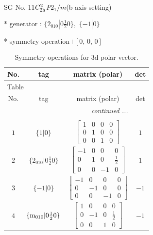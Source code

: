 \documentclass[fleqn,8pt]{jsarticle}
\begin{document}
\setcounter{MaxMatrixCols}{32}

\renewcommand{\tablename}{Table~}
\renewcommand{\figurename}{Figure~}
\begin{center}
\LARGE
SG No. 11\quad$C_{\rm 2h}^{2}$\quad$P2_1/m$\quad(b-axis setting)\quad[ monoclinic ]
\end{center}

* generator : $\{2{}_{010}|0 \frac{1}{2} 0\},\,\,\{-1|0\}$

* symmetry operation\quad$+\left[ 0,\, 0,\, 0 \right]$
\renewcommand{\arraystretch}{1.3}
\begin{longtable}{cccc}
\caption{Symmetry operations for 3d polar vector.}
 \\
 \hline \hline
No. & tag & matrix (polar) & det \\ \hline \endfirsthead

\multicolumn{3}{l}{\tablename\ \thetable{}} \\
 \hline \hline
No. & tag & matrix (polar) & det \\ \hline \endhead

 \hline \hline
\multicolumn{3}{r}{\footnotesize\it continued ...} \\ \endfoot

 \hline \hline
\multicolumn{3}{r}{} \\ \endlastfoot

$ 1 $ & $ \{1|0\} $ & $ \begin{bmatrix} 1 & 0 & 0 & 0 \\ 0 & 1 & 0 & 0 \\ 0 & 0 & 1 & 0 \end{bmatrix} $ & $ 1 $ \\ \hline
$ 2 $ & $ \{2{}_{010}|0 \frac{1}{2} 0\} $ & $ \begin{bmatrix} -1 & 0 & 0 & 0 \\ 0 & 1 & 0 & \frac{1}{2} \\ 0 & 0 & -1 & 0 \end{bmatrix} $ & $ 1 $ \\ \hline
$ 3 $ & $ \{-1|0\} $ & $ \begin{bmatrix} -1 & 0 & 0 & 0 \\ 0 & -1 & 0 & 0 \\ 0 & 0 & -1 & 0 \end{bmatrix} $ & $ -1 $ \\ \hline
$ 4 $ & $ \{{\rm m}_{010}|0 \frac{1}{2} 0\} $ & $ \begin{bmatrix} 1 & 0 & 0 & 0 \\ 0 & -1 & 0 & \frac{1}{2} \\ 0 & 0 & 1 & 0 \end{bmatrix} $ & $ -1 $ \\
\end{longtable}
\end{document}
